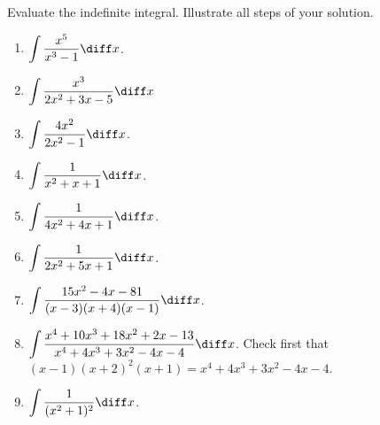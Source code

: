 Evaluate the indefinite integral. Illustrate all steps of your solution. 
\begin{multicols}{2}
\begin{enumerate}
\item $\displaystyle \int \frac{x^5 }{x^3-1}\diff x$.
\item $\displaystyle\int \frac{x^3 }{2x^2+3x-5}\diff x$ 

\item $\displaystyle\int \frac{4x^2 }{2x^2-1}\diff x$.
\item $\displaystyle\int \frac{1}{x^2+x+1}\diff x$.
\item $\displaystyle\int \frac{1}{4x^2+4x+1}\diff x$.
\item $\displaystyle\int \frac{1}{2x^2+5x+1}\diff x$.
\item $\displaystyle\int \frac{15x^2-4x-81}{ (x-3)(x +4)(x-1)}\diff x$.
\item $\displaystyle\int \frac {x^{4}+10x^{3}+18x^{2}+2x- 13}{x^{4} +4x^{3} +3x^{2}- 4x-4}\diff x$. 
Check first that $(x-1)(x+2)^2(x+1)= x^{4}+4x^{3}+3x^{2}-4x-4$. 
\item $\displaystyle \int \frac{1}{(x^2+1)^2}\diff x$.
\end{enumerate}
\end{multicols}